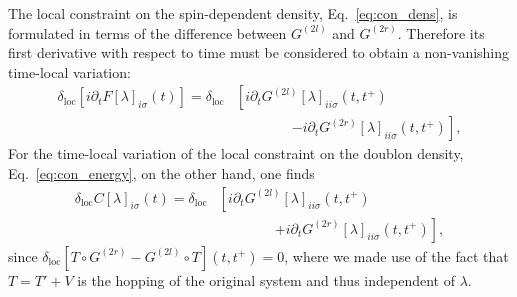 \documentclass[twocolumn,prb,showpacs,aps,superscriptaddress]{revtex4}
\newcommand{\deltaloc}[0]{\ensuremath{\delta_\mathrm{loc}}}
\begin{document}
The local constraint on the spin-dependent density, Eq.\
\eqref{eq:con_dens}, is formulated in terms of the difference between
$G^{(2l)}$ and $G^{(2r)}$. Therefore its first derivative with respect to time
must be considered to obtain a non-vanishing time-local variation:
\begin{align}
  \label{eq:var_F}
  \deltaloc [i\partial_t F[\lambda]_{i\sigma}(t)]
  =
  \deltaloc 
  &\left[
  i\partial_t G^{(2l)}[\lambda]_{ii\sigma}(t,t^+) 
  \right.\\
  &\quad\quad\quad\quad \left.
    -
    i\partial_t G^{(2r)}[\lambda]_{ii\sigma}(t,t^+) 
  \right],\nonumber
\end{align}
For the time-local variation of the local constraint on the doublon density,
Eq.\ \eqref{eq:con_energy}, on the other hand, one finds
\begin{align}
  \label{eq:var_C}
  \deltaloc C[\lambda]_{i\sigma}(t)
  =
  \deltaloc 
  &\left[
  i\partial_t G^{(2l)}[\lambda]_{ii\sigma}(t,t^+) 
  \right.\\
  &\quad\quad\quad\quad \left.
    +
    i\partial_t G^{(2r)}[\lambda]_{ii\sigma}(t,t^+) 
  \right],\nonumber
\end{align}
since $\deltaloc [T \circ G^{(2r)} - G^{(2l)} \circ T](t,t^+) = 0$, where we
made use of the fact that $T = T' + V$ is the hopping of the original system
and thus independent of $\lambda$.
\end{document}
